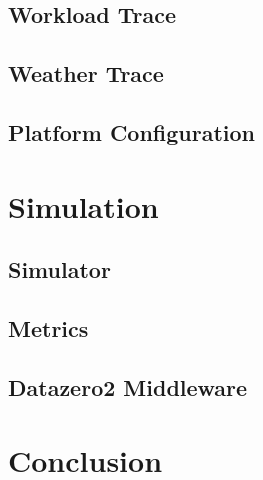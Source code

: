\subsection{Workload Trace}

\subsection{Weather Trace}

\subsection{Platform Configuration}

\section{Simulation}

\subsection{Simulator}

\subsection{Metrics}

\subsection{Datazero2 Middleware}

\section{Conclusion}